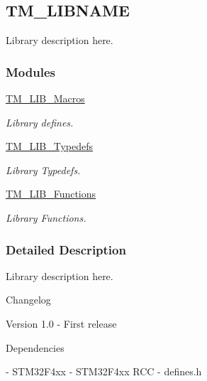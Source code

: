 \hypertarget{group___t_m___l_i_b_n_a_m_e}{}\subsection{T\+M\+\_\+\+L\+I\+B\+N\+A\+M\+E}
\label{group___t_m___l_i_b_n_a_m_e}


Library description here.  


\subsubsection*{Modules}
\begin{DoxyCompactItemize}
\item 
\hyperlink{group___t_m___l_i_b___macros}{T\+M\+\_\+\+L\+I\+B\+\_\+\+Macros}
\begin{DoxyCompactList}\small\item\em Library defines. \end{DoxyCompactList}\item 
\hyperlink{group___t_m___l_i_b___typedefs}{T\+M\+\_\+\+L\+I\+B\+\_\+\+Typedefs}
\begin{DoxyCompactList}\small\item\em Library Typedefs. \end{DoxyCompactList}\item 
\hyperlink{group___t_m___l_i_b___functions}{T\+M\+\_\+\+L\+I\+B\+\_\+\+Functions}
\begin{DoxyCompactList}\small\item\em Library Functions. \end{DoxyCompactList}\end{DoxyCompactItemize}


\subsubsection{Detailed Description}
Library description here. 

\begin{DoxyParagraph}{Changelog}

\end{DoxyParagraph}
\begin{DoxyVerb} Version 1.0
  - First release
\end{DoxyVerb}


\begin{DoxyParagraph}{Dependencies}

\end{DoxyParagraph}
\begin{DoxyVerb} - STM32F4xx
 - STM32F4xx RCC
 - defines.h
\end{DoxyVerb}
 